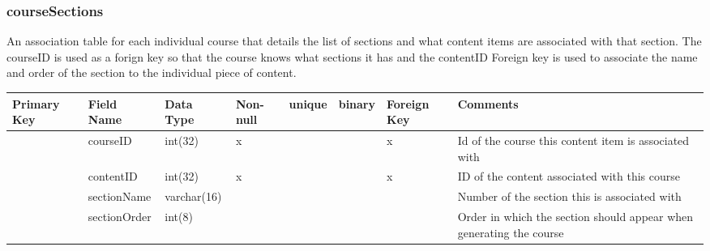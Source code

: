 \documentclass{article}
\begin{document}
\subsubsection{courseSections}
An association table for each individual course that details the list of sections and what content items are associated with that section. The courseID is used as a forign key so that the course knows what sections it has and the contentID Foreign key is used to associate the name and order of the section to the individual piece of content. \\
\begin{tabular}{|m{1cm} | m{2cm} | m{2cm}| m{1cm} | m{1cm}| m{1cm} | m{1cm}| m{3.5cm}| }
  \hline
  Primary Key & Field Name & Data Type & Non-null & unique & binary & Foreign Key & Comments\\ 
  \hline
   & courseID & int(32) & x & & & x & Id of the course this content item is associated with\\
  \hline
   & contentID & int(32) & x & & & x & ID of the content associated with this course\\
  \hline
   & sectionName & varchar(16) & & & & & Number of the section this is associated with\\
  \hline
   & sectionOrder & int(8) & & & & & Order in which the section should appear when generating the course\\
  \hline
\end{tabular}
\end{document}
